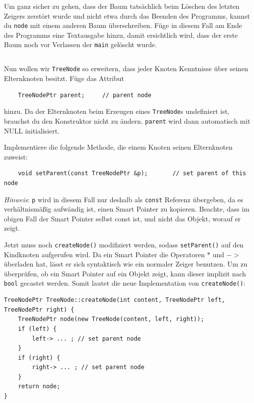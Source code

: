 Um ganz sicher zu gehen, dass der Baum tatsächlich beim Löschen des letzten Zeigers zerstört wurde und nicht etwa durch das Beenden des Programms, kannst du \texttt{node} mit einem anderen Baum überschreiben.
Füge in diesem Fall am Ende des Programms eine Textausgabe hinzu, damit ersichtlich wird, dass der erste Baum noch vor Verlassen der \texttt{main} gelöscht wurde.

\subsection{}
Nun wollen wir \texttt{TreeNode} so erweitern, dass jeder Knoten Kenntnisse über seinen Elternknoten besitzt.
Füge das Attribut

\begin{lstlisting}
	TreeNodePtr parent;		// parent node
\end{lstlisting}

hinzu.
Da der Elternknoten beim Erzeugen eines \texttt{TreeNode}s undefiniert ist, brauchst du den Konstruktor nicht zu ändern. \texttt{parent} wird dann automatisch mit NULL initialisiert.

Implementiere die folgende Methode, die einem Knoten seinen Elternknoten zuweist:

\begin{lstlisting}
	void setParent(const TreeNodePtr &p);		// set parent of this node
\end{lstlisting}

\emph{Hinweis}:
\texttt{p} wird in diesem Fall nur deshalb als \texttt{const} Referenz übergeben, da es verhältnismäßig aufwändig ist, einen Smart Pointer zu kopieren.
Beachte, dass im obigen Fall der Smart Pointer selbst const ist, und nicht das Objekt, worauf er zeigt.

Jetzt muss noch \texttt{createNode()} modifiziert werden, sodass \texttt{setParent()} auf den Kindknoten aufgerufen wird. Da ein Smart Pointer die Operatoren $*$ und $->$ überladen hat, lässt er sich syntaktisch wie ein normaler Zeiger benutzen. Um zu überprüfen, ob ein Smart Pointer auf ein Objekt zeigt, kann dieser implizit nach \texttt{bool} gecastet werden. Somit lautet die neue Implementation von \texttt{createNode()}:

\begin{lstlisting}
TreeNodePtr TreeNode::createNode(int content, TreeNodePtr left, TreeNodePtr right) {
	TreeNodePtr node(new TreeNode(content, left, right));
	if (left) {
		left-> ... ; // set parent node
	}
	if (right) {
		right-> ... ; // set parent node
	}
	return node;
}
\end{lstlisting}

